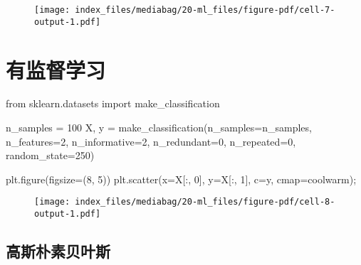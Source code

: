 \documentclass[
  letterpaper,
  DIV=11,
  numbers=noendperiod]{scrreprt}
\newenvironment{Shaded}{\begin{snugshade}}{\end{snugshade}}
\newcommand{\DecValTok}[1]{\textcolor[rgb]{0.68,0.00,0.00}{#1}}
\newcommand{\ImportTok}[1]{\textcolor[rgb]{0.00,0.46,0.62}{#1}}
\newcommand{\NormalTok}[1]{\textcolor[rgb]{0.00,0.23,0.31}{#1}}
\newcommand{\OperatorTok}[1]{\textcolor[rgb]{0.37,0.37,0.37}{#1}}
\newcommand{\StringTok}[1]{\textcolor[rgb]{0.13,0.47,0.30}{#1}}
\begin{document}
\begin{figure}[H]

{\centering \texttt{[image: index\_files/mediabag/20-ml\_files/figure-pdf/cell-7-output-1.pdf]}

}

\end{figure}

\hypertarget{ux6709ux76d1ux7763ux5b66ux4e60}{%
\section{有监督学习}\label{ux6709ux76d1ux7763ux5b66ux4e60}}

\begin{Shaded}
\begin{Highlighting}[]
\ImportTok{from}\NormalTok{ sklearn.datasets }\ImportTok{import}\NormalTok{ make\_classification }

\NormalTok{n\_samples }\OperatorTok{=} \DecValTok{100} 
\NormalTok{X, y }\OperatorTok{=}\NormalTok{ make\_classification(n\_samples}\OperatorTok{=}\NormalTok{n\_samples, n\_features}\OperatorTok{=}\DecValTok{2}\NormalTok{, }
\NormalTok{                                    n\_informative}\OperatorTok{=}\DecValTok{2}\NormalTok{, n\_redundant}\OperatorTok{=}\DecValTok{0}\NormalTok{, }
\NormalTok{                                    n\_repeated}\OperatorTok{=}\DecValTok{0}\NormalTok{, random\_state}\OperatorTok{=}\DecValTok{250}\NormalTok{)}


\NormalTok{plt.figure(figsize}\OperatorTok{=}\NormalTok{(}\DecValTok{8}\NormalTok{, }\DecValTok{5}\NormalTok{)) }
\NormalTok{plt.scatter(x}\OperatorTok{=}\NormalTok{X[:, }\DecValTok{0}\NormalTok{], y}\OperatorTok{=}\NormalTok{X[:, }\DecValTok{1}\NormalTok{], c}\OperatorTok{=}\NormalTok{y, cmap}\OperatorTok{=}\StringTok{\textquotesingle{}coolwarm\textquotesingle{}}\NormalTok{)}\OperatorTok{;} 
\end{Highlighting}
\end{Shaded}

\begin{figure}[H]

{\centering \texttt{[image: index\_files/mediabag/20-ml\_files/figure-pdf/cell-8-output-1.pdf]}

}

\end{figure}

\hypertarget{ux9ad8ux65afux6734ux7d20ux8d1dux53f6ux65af}{%
\subsection{高斯朴素贝叶斯}\label{ux9ad8ux65afux6734ux7d20ux8d1dux53f6ux65af}}
\end{document}
